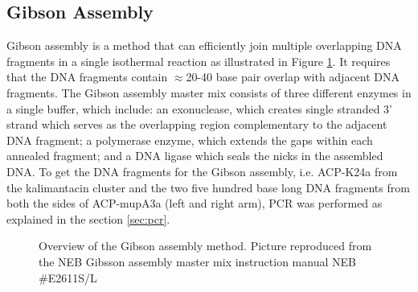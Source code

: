 						
		\subsection{Gibson Assembly}
		\label{sec:gibson}
		Gibson assembly is a method that can efficiently join multiple overlapping DNA fragments in a single isothermal reaction as illustrated in Figure \ref{fig:gibson}. It requires that the DNA fragments contain $ \approx $20-40 base pair overlap with adjacent DNA fragments. The Gibson assembly master mix consists of three different enzymes in a single buffer, which include: an exonuclease, which creates single stranded 3' strand which serves as the overlapping region complementary to the adjacent DNA fragment; a polymerase enzyme, which extends the gaps within each annealed fragment; and a DNA ligase which seals the nicks in the assembled DNA. To get the DNA fragments for the Gibson assembly, i.e. ACP-K24a from the kalimantacin cluster and the two five hundred base long DNA fragments from both the sides of ACP-mupA3a (left and right arm), PCR was performed as explained in the section \ref{sec:pcr}. 
		
			\setlength\fboxsep{5pt}
			\setlength\fboxrule{1.5pt}
			\begin{figure} [htbp]
			\centering
			\caption[Overview of the Gibson assembly method]{Overview of the Gibson assembly method. Picture reproduced from the NEB Gibsson assembly master mix instruction manual NEB \#E2611S/L}
			\label{fig:gibson}
			\end{figure}				
		
